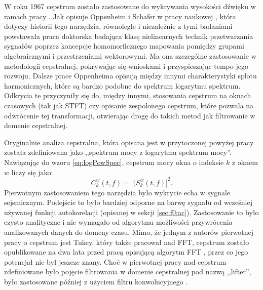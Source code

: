 \documentclass[12pt,a4paper,twoside]{mwart}
\begin{document}
W roku 1967 cepstrum zostało zastosowane do wykrywania wysokości dźwięku w ramach pracy \cite{Transcription:Noll:CepstrumPitchDetermination}. Jak opisuje Oppenheim i Schafer w pracy naukowej 
\cite[95-99]{Transcription:Oppenheim:HistoryOfCepstrum},
która dotyczy historii tego narzędzia, równolegle i niezależnie z tymi badaniami powstawała praca doktorska \cite{Transcription:Oppenheim:Superposition} badająca klasę nielinearnych technik przetwarzania sygnałów poprzez koncepcje homomorficznego mapowania pomiędzy grupami algebraicznymi i przestrzeniami wektorowymi. Ma ona szczególne zastosowanie w metodologii cepstralnej, pokrywając się wnioskami i przyspieszając tempo jego rozwoju. Dalsze prace Oppenheima opisują między innymi charakterystyki splotu harmonicznych, które są bardzo podobne do spektrum logarytmu spektrum. Odkrycia te przyczyniły się do, między innymi, stosowania cepstrum na oknach czasowych (tak jak STFT) czy opisanie zespolonego cepstrum, które pozwala na odwrócenie tej transformacji, otwierając drogę do takich metod jak filtrowanie w domenie cepstralnej.

Oryginalnie analiza cepstralna, która opisana jest w przytoczonej powyżej pracy \cite{Transcription:Bogert:FirstCepstrum} została zdefiniowana jako ,,spektrum mocy z logarytmu spektrum mocy''. Nawiązując do wzoru \ref{eq:logPowSpec}, cepstrum mocy okna o indeksie $k$ z oknem $w$ liczy się jako:
\begin{equation}\label{eq:ceps1}
  C_k^w(t, f) = |(S_k^w(t,f)|^2.
\end{equation}
Pierwotnym zastosowaniem tego narzędzia było wykrycie echa w sygnale sejsmicznym. Podejście to było bardziej odporne na barwę sygnału od wcześniej używanej funkcji autokorelacji (opisanej w sekcji \ref{sec:f0:ac}). Zastosowanie to było czysto analityczne i nie wymagało od algorytmu możliwości przywrócenia analizowanych danych do domeny czasu. Mimo, że jednym z autorów pierwotnej pracy o cepstrum jest Tukey, który także pracował nad FFT, cepstrum zostało opublikowane na dwa lata przed pracą opisującą algorytm FFT \cite{Transcription:Tukey:FFT}, przez co jego potencjał nie był jeszcze znany. Choć w pierwotnej pracy nad cepstrum zdefiniowane było pojęcie filtrowania w domenie cepstralnej pod nazwą ,,lifter'', było zastosowane później z użyciem filtru konwolucyjnego 
\cite[1-2]{Transcription:Randall:CepstrumHistory}.
\end{document}
